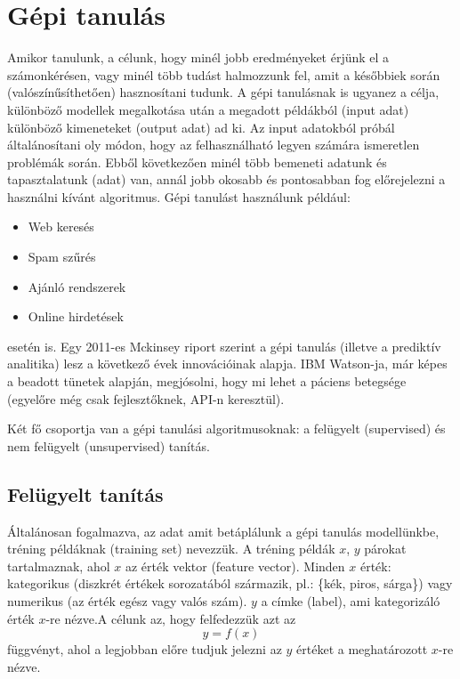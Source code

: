 \documentclass[a4paper,12pt]{article}
\begin{document}
\section{Gépi tanulás}

Amikor tanulunk, a célunk, hogy minél jobb eredményeket érjünk el a számonkérésen, vagy minél több tudást halmozzunk fel, amit a későbbiek során (valószínűsíthetően) hasznosítani tudunk. A gépi tanulásnak is ugyanez a célja, különböző modellek megalkotása után a megadott példákból (input adat) különböző kimeneteket (output adat) ad ki. Az input adatokból próbál általánosítani oly módon, hogy az felhasználható legyen számára ismeretlen problémák során. Ebből következően minél több bemeneti adatunk és tapasztalatunk (adat) van, annál jobb okosabb és pontosabban fog előrejelezni a használni kívánt algoritmus. Gépi tanulást használunk például: 
\begin{itemize}
\item Web keresés
\item Spam szűrés
\item Ajánló rendszerek
\item Online hirdetések
\end{itemize}
esetén is. 
Egy 2011-es Mckinsey riport \cite{mckinsey} szerint a gépi tanulás (illetve a prediktív analitika) lesz a következő évek innovációinak alapja. IBM Watson-ja\cite{watson}, már képes a beadott tünetek alapján, megjósolni, hogy mi lehet a páciens betegsége (egyelőre még csak fejlesztőknek, API-n keresztül). \newline

Két fő csoportja van a gépi tanulási algoritmusoknak: a felügyelt (supervised) és nem felügyelt (unsupervised) tanítás.

\subsection{Felügyelt tanítás}

Általánosan fogalmazva, az adat amit betáplálunk a gépi tanulás modellünkbe, tréning példáknak (training set) nevezzük. A tréning példák $x$, $y$ párokat tartalmaznak, ahol $x$ az érték vektor (feature vector). Minden $x$ érték: kategorikus (diszkrét értékek sorozatából származik, pl.: \{kék, piros, sárga\}) vagy numerikus (az érték egész vagy valós szám). $y$ a címke (label), ami kategorizáló érték $x$-re nézve.A célunk az, hogy felfedezzük azt az 
\begin{equation*} y=f(x)
\end{equation*}
függvényt, ahol a legjobban előre tudjuk jelezni az $y$ értéket a meghatározott $x$-re nézve.
\end{document}

